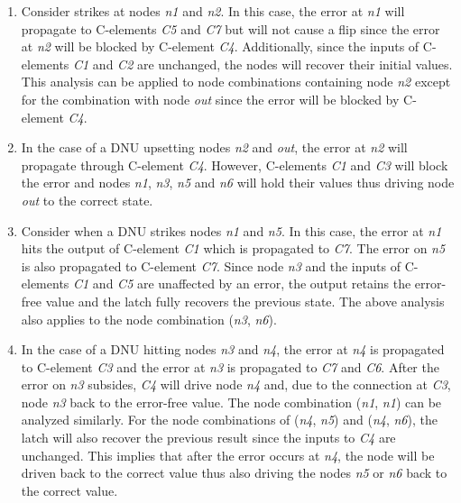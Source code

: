 \begin{enumerate}
	\item Consider strikes at nodes \textit{n1} and \textit{n2}. In this case, the error at \textit{n1} will propagate to C-elements \textit{C5} and \textit{C7} but will not cause a flip since the error at \textit{n2} will be blocked by C-element \textit{C4}. Additionally, since the inputs of C-elements \textit{C1} and \textit{C2} are unchanged, the nodes will recover their initial values. This analysis can be applied to node combinations containing node \textit{n2} except for the combination with node \textit{out} since the error will be blocked by C-element \textit{C4}.
	
	\item In the case of a DNU upsetting nodes \textit{n2} and \textit{out}, the error at \textit{n2} will propagate through C-element \textit{C4}. However, C-elements \textit{C1} and \textit{C3} will block the error and nodes \textit{n1}, \textit{n3}, \textit{n5} and \textit{n6} will hold their values thus driving node \textit{out} to the correct state. 

	\item Consider when a DNU strikes nodes \textit{n1} and \textit{n5}. In this case, the error at \textit{n1} hits the output of C-element \textit{C1} which is propagated to \textit{C7}. The error on \textit{n5} is also propagated to C-element \textit{C7}. Since node \textit{n3} and the inputs of C-elements \textit{C1} and \textit{C5} are unaffected by an error, the output retains the error-free value and the latch fully recovers the previous state. The above analysis also applies to the node combination (\textit{n3}, \textit{n6}).

	\item In the case of a DNU hitting nodes \textit{n3} and \textit{n4}, the error at \textit{n4} is propagated to C-element \textit{C3} and the error at \textit{n3} is propagated to \textit{C7} and \textit{C6}. After the error on \textit{n3} subsides, \textit{C4} will drive node \textit{n4} and, due to the connection at \textit{C3}, node \textit{n3} back to the error-free value. The node combination (\textit{n1}, \textit{n1}) can be analyzed similarly. For the node combinations of (\textit{n4}, \textit{n5}) and (\textit{n4}, \textit{n6}), the latch will also recover the previous result since the inputs to \textit{C4} are unchanged. This implies that after the error occurs at \textit{n4}, the node will be driven back to the correct value thus also driving the nodes \textit{n5} or \textit{n6} back to the correct value.
	

\end{enumerate}

